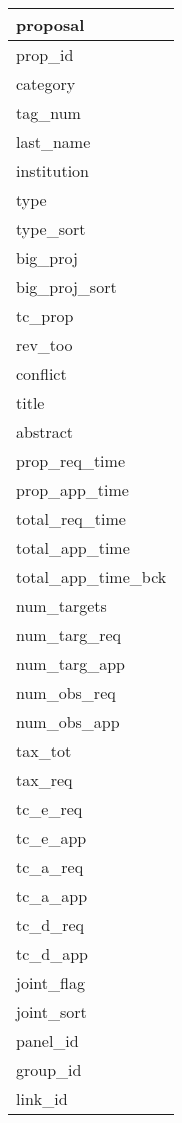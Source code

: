 \documentclass{article}
\begin{document}

\begin{tabular}{|l|} \hline
\textbf{proposal} \\ \hline
prop\_id  \\ \hline
category \\ \hline
tag\_num \\ \hline
last\_name \\ \hline
institution \\ \hline
type \\ \hline
type\_sort \\ \hline
big\_proj \\ \hline
big\_proj\_sort \\ \hline
tc\_prop \\ \hline
rev\_too \\ \hline
conflict \\ \hline
title \\ \hline
abstract \\ \hline
prop\_req\_time \\ \hline
prop\_app\_time \\ \hline
total\_req\_time \\ \hline
total\_app\_time \\ \hline
total\_app\_time\_bck \\ \hline
num\_targets \\ \hline
num\_targ\_req \\ \hline
num\_targ\_app \\ \hline
num\_obs\_req \\ \hline
num\_obs\_app \\ \hline
tax\_tot \\ \hline
tax\_req \\ \hline
tc\_e\_req \\ \hline
tc\_e\_app \\ \hline
tc\_a\_req \\ \hline
tc\_a\_app \\ \hline
tc\_d\_req \\ \hline
tc\_d\_app \\ \hline
joint\_flag \\ \hline
joint\_sort \\ \hline
panel\_id \\ \hline
group\_id \\ \hline
link\_id \\ \hline
\end{tabular}
\end{document}
